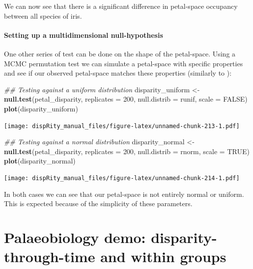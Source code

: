 \documentclass[
]{book}
\newenvironment{Shaded}{\begin{snugshade}}{\end{snugshade}}
\newcommand{\CommentTok}[1]{\textcolor[rgb]{0.56,0.35,0.01}{\textit{#1}}}
\newcommand{\DataTypeTok}[1]{\textcolor[rgb]{0.13,0.29,0.53}{#1}}
\newcommand{\DecValTok}[1]{\textcolor[rgb]{0.00,0.00,0.81}{#1}}
\newcommand{\KeywordTok}[1]{\textcolor[rgb]{0.13,0.29,0.53}{\textbf{#1}}}
\newcommand{\NormalTok}[1]{#1}
\newcommand{\OtherTok}[1]{\textcolor[rgb]{0.56,0.35,0.01}{#1}}
\newcommand{\StringTok}[1]{\textcolor[rgb]{0.31,0.60,0.02}{#1}}
\begin{document}
We can now see that there is a significant difference in petal-space occupancy between all species of iris.

\hypertarget{setting-up-a-multidimensional-null-hypothesis}{%
\subsubsection{Setting up a multidimensional null-hypothesis}\label{setting-up-a-multidimensional-null-hypothesis}}

One other series of test can be done on the shape of the petal-space.
Using a MCMC permutation test we can simulate a petal-space with specific properties and see if our observed petal-space matches these properties (similarly to \citet{diaz2016global}):

\begin{Shaded}
\begin{Highlighting}[]
\CommentTok{\#\# Testing against a uniform distribution}
\NormalTok{disparity\_uniform \textless{}{-}}\StringTok{ }\KeywordTok{null.test}\NormalTok{(petal\_disparity, }\DataTypeTok{replicates =} \DecValTok{200}\NormalTok{,}
    \DataTypeTok{null.distrib =}\NormalTok{ runif, }\DataTypeTok{scale =} \OtherTok{FALSE}\NormalTok{)}
\KeywordTok{plot}\NormalTok{(disparity\_uniform)}
\end{Highlighting}
\end{Shaded}

\texttt{[image: dispRity\_manual\_files/figure-latex/unnamed-chunk-213-1.pdf]}

\begin{Shaded}
\begin{Highlighting}[]
\CommentTok{\#\# Testing against a normal distribution}
\NormalTok{disparity\_normal \textless{}{-}}\StringTok{ }\KeywordTok{null.test}\NormalTok{(petal\_disparity, }\DataTypeTok{replicates =} \DecValTok{200}\NormalTok{,}
    \DataTypeTok{null.distrib =}\NormalTok{ rnorm, }\DataTypeTok{scale =} \OtherTok{TRUE}\NormalTok{)}
\KeywordTok{plot}\NormalTok{(disparity\_normal)}
\end{Highlighting}
\end{Shaded}

\texttt{[image: dispRity\_manual\_files/figure-latex/unnamed-chunk-214-1.pdf]}

In both cases we can see that our petal-space is not entirely normal or uniform.
This is expected because of the simplicity of these parameters.

\hypertarget{palaeobiology-demo-disparity-through-time-and-within-groups}{%
\chapter{Palaeobiology demo: disparity-through-time and within groups}\label{palaeobiology-demo-disparity-through-time-and-within-groups}}
\end{document}
